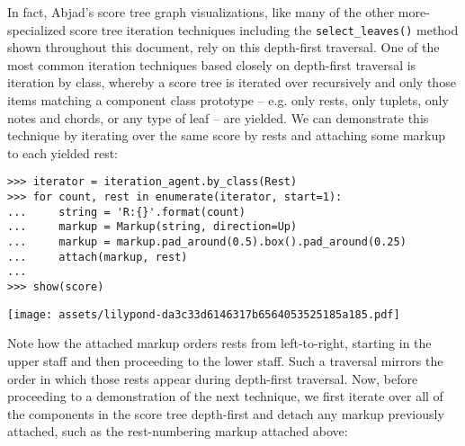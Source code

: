 \noindent In fact, Abjad's score tree graph visualizations, like many of the
other more-specialized score tree iteration techniques including the
\texttt{select\_leaves()} method shown throughout this document, rely on this
depth-first traversal. One of the most common iteration techniques based
closely on depth-first traversal is iteration by class, whereby a score tree is
iterated over recursively and only those items matching a component class
prototype -- e.g. only rests, only tuplets, only notes and chords, or any type
of leaf -- are yielded. We can demonstrate this technique by iterating over the
same score by rests and attaching some markup to each yielded rest:

\begin{comment}
<abjad>
iterator = iteration_agent.by_class(Rest)
for count, rest in enumerate(iterator, start=1):
    string = 'R:{}'.format(count)
    markup = Markup(string, direction=Up)
    markup = markup.pad_around(0.5).box().pad_around(0.25)
    attach(markup, rest)

show(score)
</abjad>
\end{comment}

\begin{abjadbookoutput}
\begin{singlespacing}
\vspace{-0.5\baselineskip}
\begin{lstlisting}
>>> iterator = iteration_agent.by_class(Rest)
>>> for count, rest in enumerate(iterator, start=1):
...     string = 'R:{}'.format(count)
...     markup = Markup(string, direction=Up)
...     markup = markup.pad_around(0.5).box().pad_around(0.25)
...     attach(markup, rest)
...
>>> show(score)
\end{lstlisting}
\noindent\texttt{[image: assets/lilypond-da3c33d6146317b6564053525185a185.pdf]}
\end{singlespacing}
\end{abjadbookoutput}

\noindent Note how the attached markup orders rests from left-to-right,
starting in the upper staff and then proceeding to the lower staff. Such a
traversal mirrors the order in which those rests appear during depth-first
traversal. Now, before proceeding to a demonstration of the next technique, we
first iterate over all of the components in the score tree depth-first and
detach any markup previously attached, such as the rest-numbering markup
attached above:

\begin{comment}
<abjad>
for component in iteration_agent.depth_first():
    detached = detach(Markup, component)
</abjad>
\end{comment}

